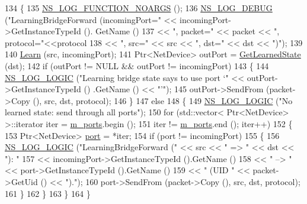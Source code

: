\begin{DoxyCode}
134 \{
135   \hyperlink{log-macros-disabled_8h_a8f7e4afc291c9d29a65c18ac1f79197b}{NS\_LOG\_FUNCTION\_NOARGS} ();
136   \hyperlink{group__logging_ga413f1886406d49f59a6a0a89b77b4d0a}{NS\_LOG\_DEBUG} (\textcolor{stringliteral}{"LearningBridgeForward (incomingPort="} << incomingPort->GetInstanceTypeId ().
      GetName ()
137                                                        << \textcolor{stringliteral}{", packet="} << packet << \textcolor{stringliteral}{", protocol="}<<protocol
138                                                        << \textcolor{stringliteral}{", src="} << src << \textcolor{stringliteral}{", dst="} << dst << \textcolor{stringliteral}{")"});
139 
140   \hyperlink{classns3_1_1BridgeNetDevice_a9e0a97f4e3b3aa2cd1a3516cb739f721}{Learn} (src, incomingPort);
141   Ptr<NetDevice> outPort = \hyperlink{classns3_1_1BridgeNetDevice_a944d20ca7524ef699812e653670407b6}{GetLearnedState} (dst);
142   \textcolor{keywordflow}{if} (outPort != NULL && outPort != incomingPort)
143     \{
144       \hyperlink{group__logging_ga88acd260151caf2db9c0fc84997f45ce}{NS\_LOG\_LOGIC} (\textcolor{stringliteral}{"Learning bridge state says to use port `"} << outPort->GetInstanceTypeId ()
      .GetName () << \textcolor{stringliteral}{"'"});
145       outPort->SendFrom (packet->Copy (), src, dst, protocol);
146     \}
147   \textcolor{keywordflow}{else}
148     \{
149       \hyperlink{group__logging_ga88acd260151caf2db9c0fc84997f45ce}{NS\_LOG\_LOGIC} (\textcolor{stringliteral}{"No learned state: send through all ports"});
150       \textcolor{keywordflow}{for} (std::vector< Ptr<NetDevice> >::iterator iter = \hyperlink{classns3_1_1BridgeNetDevice_accf2a9a81b4be28b155d6b5aeeb185be}{m\_ports}.begin ();
151            iter != \hyperlink{classns3_1_1BridgeNetDevice_accf2a9a81b4be28b155d6b5aeeb185be}{m\_ports}.end (); iter++)
152         \{
153           Ptr<NetDevice> \hyperlink{dsdv-manet_8cc_a8e0798404bf2cf5dabb84c5ba9a4f236}{port} = *iter;
154           \textcolor{keywordflow}{if} (port != incomingPort)
155             \{
156               \hyperlink{group__logging_ga88acd260151caf2db9c0fc84997f45ce}{NS\_LOG\_LOGIC} (\textcolor{stringliteral}{"LearningBridgeForward ("} << src << \textcolor{stringliteral}{" => "} << dst << \textcolor{stringliteral}{"): "} 
157                                                       << incomingPort->GetInstanceTypeId ().GetName ()
158                                                       << \textcolor{stringliteral}{" --> "} << port->GetInstanceTypeId ().GetName ()
159                                                       << \textcolor{stringliteral}{" (UID "} << packet->GetUid () << \textcolor{stringliteral}{")."});
160               port->SendFrom (packet->Copy (), src, dst, protocol);
161             \}
162         \}
163     \}
164 \}
\end{DoxyCode}


